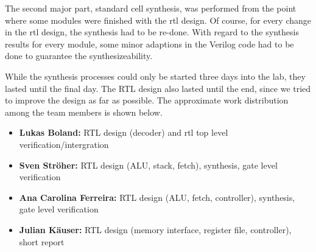 The second major part, standard cell synthesis, was performed from the point where some modules were finished with the rtl design. Of course, for every change in the rtl design, the synthesis had to be re-done. With regard to the synthesis results for every module, some minor adaptions in the Verilog code had to be done to guarantee the synthesizeability.

While the synthesis processes could only be started three days into the lab, they lasted until the final day. The RTL design also lasted until the end, since we tried to improve the design as far as possible. The approximate work distribution among the team members is shown below.

\begin{itemize}
\item \textbf{Lukas Boland:} RTL design (decoder) and rtl top level verification/intergration
\item \textbf{Sven Str\"oher:} RTL design (ALU, stack, fetch), synthesis, gate level verification
\item \textbf{Ana Carolina Ferreira:} RTL design (ALU, fetch, controller), synthesis, gate level verification
\item \textbf{Julian K\"auser:} RTL design (memory interface, register file, controller), short report
\end{itemize}



